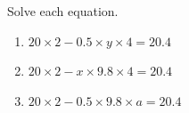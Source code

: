 Solve each equation.
\begin{enumerate}
\item[(a)] $20\times2-0.5\times y\times4=20.4$
\item[(b)] $20\times2-x\times9.8\times4=20.4$
\item[(c)] $20\times2-0.5\times9.8\times a=20.4$
\end{enumerate}
